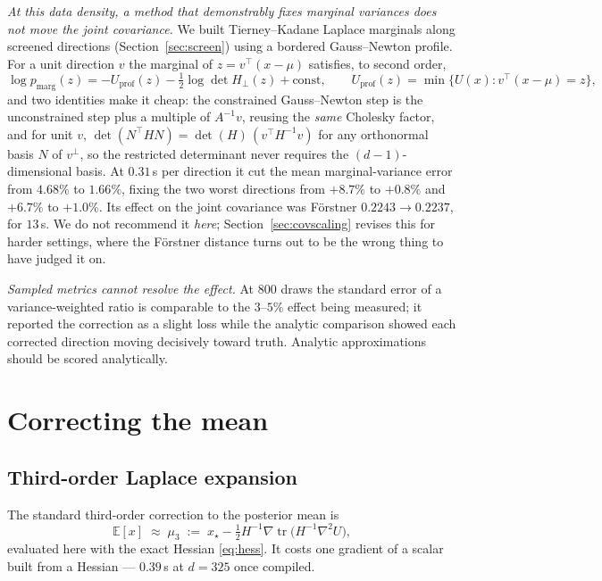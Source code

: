 \documentclass[11pt]{article}
\newcommand{\E}{\mathbb{E}}
\newcommand{\tr}{\operatorname{tr}}
\newcommand{\xmap}{x_{\star}}
\theoremstyle{plain}
\theoremstyle{definition}
\theoremstyle{remark}
\begin{document}
\emph{At this data density, a method that demonstrably fixes marginal variances does not move the
joint covariance.} We
built Tierney--Kadane Laplace marginals \cite{tierney1986} along screened directions (Section~\ref{sec:screen})
using a bordered Gauss--Newton profile. For a unit direction $v$ the marginal of $z = v^\top(x-\mu)$
satisfies, to second order,
\[
  \log p_{\text{marg}}(z) = -U_{\text{prof}}(z) - \tfrac12\log\det H_\perp(z) + \text{const},
  \qquad U_{\text{prof}}(z) = \min\{U(x) : v^\top(x-\mu) = z\},
\]
and two identities make it cheap: the constrained Gauss--Newton step is the unconstrained step plus
a multiple of $A^{-1}v$, reusing the \emph{same} Cholesky factor, and for unit $v$,
$\det(N^\top H N) = \det(H)\,(v^\top H^{-1} v)$ for any orthonormal basis $N$ of $v^\perp$, so the
restricted determinant never requires the $(d{-}1)$-dimensional basis. At $0.31$\,s per direction it
cut the mean marginal-variance error from $4.68\%$ to $1.66\%$, fixing the two worst directions from
$+8.7\%$ to $+0.8\%$ and $+6.7\%$ to $+1.0\%$. Its effect on the joint covariance was F\"orstner
$0.2243 \to 0.2237$, for $13$\,s. We do not recommend it \emph{here}; Section~\ref{sec:covscaling}
revises this for harder settings, where the F\"orstner distance turns out to be the wrong thing to
have judged it on.

\emph{Sampled metrics cannot resolve the effect.} At $800$ draws the standard error of a
variance-weighted ratio is comparable to the $3$--$5\%$ effect being measured; it reported the
correction as a slight loss while the analytic comparison showed each corrected direction moving
decisively toward truth. Analytic approximations should be scored analytically.

\section{Correcting the mean}
\label{sec:correction}

\subsection{Third-order Laplace expansion}

The standard third-order correction to the posterior mean \cite{tierney1986,kass1990} is
\begin{equation}
\label{eq:third}
  \E[x] \;\approx\; \mu_3 \;:=\; \xmap - \tfrac12 H^{-1}\nabla \tr\!\big(H^{-1}\nabla^2 U\big),
\end{equation}
evaluated here with the exact Hessian \eqref{eq:hess}. It costs one gradient of a scalar built from
a Hessian --- $0.39$\,s at $d=325$ once compiled.
\end{document}
